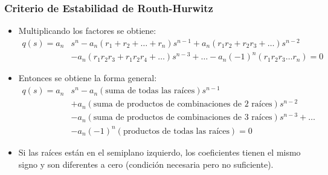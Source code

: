 \documentclass[aspectratio=169]{beamer}
\theoremstyle{definition}
\theoremstyle{plain}
\theoremstyle{remark}
\begin{document}
\begin{frame}[<+->]\frametitle{Criterio de Estabilidad de Routh-Hurwitz}
\begin{itemize}
	\item Multiplicando los factores se obtiene:
	\begin{align*}
		q(s) = a_n& s^n - a_n(r_1 + r_2 + \dots + r_n)s^{n-1} + a_n(r_1r_2 + r_2r_3 + \dots)s^{n-2}\\
		&- a_n(r_1r_2r_3 + r_1r_2r_4 + \dots)s^{n-3} + \dots - a_n(-1)^n(r_1r_2r_3 \dots r_n) = 0
	\end{align*}
	\item Entonces se obtiene la forma general:
	\begin{align*}
		q(s) = a_n& s^n - a_n(\text{suma de todas las raíces})s^{n-1}\\
		&+ a_n(\text{suma de productos de combinaciones de 2 raíces})s^{n-2}\\
		&- a_n(\text{suma de productos de combinaciones de 3 raíces})s^{n-3} + \dots \\
		&- a_n(-1)^n(\text{productos de todas las raíces}) = 0
	\end{align*}
	\item Si las raíces están en el semiplano izquierdo, los coeficientes tienen el mismo signo y son diferentes a cero (condición necesaria pero no suficiente).
\end{itemize}
\end{frame}
\end{document}
